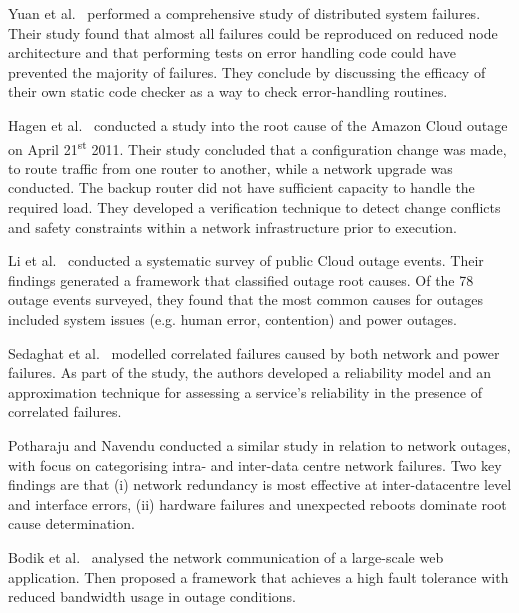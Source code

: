 \documentclass[5p]{elsarticle}
\begin{document}
Yuan et al.~\cite{yuan2014simple} performed a comprehensive study of distributed system failures. Their study found that almost all failures could be reproduced on reduced node architecture and that performing tests on error handling code could have prevented the majority of failures. They conclude by discussing the efficacy of their own static code checker as a way to check error-handling routines. \par

Hagen et al.~\cite{hagen2012efficient} conducted a study into the root cause of the Amazon Cloud outage on April 21\textsuperscript{st} 2011. Their study concluded that a configuration change was made, to route traffic from one router to another, while a network upgrade was conducted. The backup router did not have sufficient capacity to handle the required load. They developed a verification technique to detect change conflicts and safety constraints within a network infrastructure prior to execution. \par

Li et al.~\cite{li2013Cloud} conducted a systematic survey of public Cloud outage events. Their findings generated a  framework that classified outage root causes. Of the 78 outage events surveyed, they found that the most common causes for outages included system issues (e.g. human error, contention) and power outages. \par

Sedaghat et al.~\cite{sedaghat2015hard} modelled correlated failures caused by both network and power failures. As part of the study, the authors developed a reliability model and an approximation technique for assessing a service's reliability in the presence of correlated failures. \par 

Potharaju and Navendu \cite{potharaju2013network} conducted a similar study in relation to network outages, with focus on categorising intra- and inter-data centre network failures. Two key findings are that (i) network redundancy is most effective at inter-datacentre level and interface errors, (ii) hardware failures and unexpected reboots dominate root cause determination. \par

Bodik et al.~\cite{bodik2012surviving} analysed the network communication of a large-scale web application. Then proposed a framework that achieves a high fault tolerance with reduced bandwidth usage in outage conditions. \par 
\end{document}

